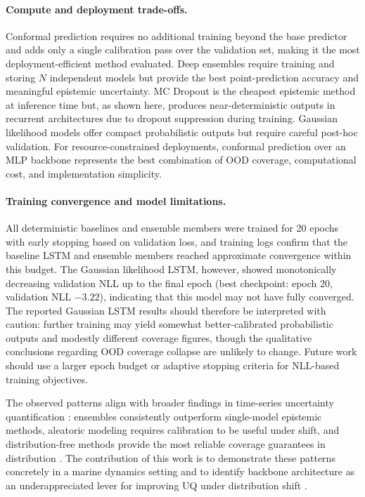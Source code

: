 \documentclass[a4paper,fleqn]{cas-sc}
\begin{document}
\paragraph{Compute and deployment trade-offs.}
Conformal prediction requires no additional training beyond the base predictor and adds only a single calibration pass over the validation set, making it the most deployment-efficient method evaluated. Deep ensembles require training and storing $N$ independent models but provide the best point-prediction accuracy and meaningful epistemic uncertainty. MC Dropout is the cheapest epistemic method at inference time but, as shown here, produces near-deterministic outputs in recurrent architectures due to dropout suppression during training. Gaussian likelihood models offer compact probabilistic outputs but require careful post-hoc validation. For resource-constrained deployments, conformal prediction over an MLP backbone represents the best combination of OOD coverage, computational cost, and implementation simplicity.

\paragraph{Training convergence and model limitations.}
All deterministic baselines and ensemble members were trained for 20 epochs with early stopping based on validation loss, and training logs confirm that the baseline LSTM and ensemble members reached approximate convergence within this budget. The Gaussian likelihood LSTM, however, showed monotonically decreasing validation NLL up to the final epoch (best checkpoint: epoch 20, validation NLL $-3.22$), indicating that this model may not have fully converged. The reported Gaussian LSTM results should therefore be interpreted with caution: further training may yield somewhat better-calibrated probabilistic outputs and modestly different coverage figures, though the qualitative conclusions regarding OOD coverage collapse are unlikely to change. Future work should use a larger epoch budget or adaptive stopping criteria for NLL-based training objectives.

The observed patterns align with broader findings in time-series uncertainty quantification \cite{foldesi2023comparison, ovadia2019can}: ensembles consistently outperform single-model epistemic methods, aleatoric modeling requires calibration to be useful under shift, and distribution-free methods provide the most reliable coverage guarantees in distribution \cite{angelopoulos2023conformal}. The contribution of this work is to demonstrate these patterns concretely in a marine dynamics setting and to identify backbone architecture as an underappreciated lever for improving UQ under distribution shift \cite{quinonero2008dataset}.
\end{document}
